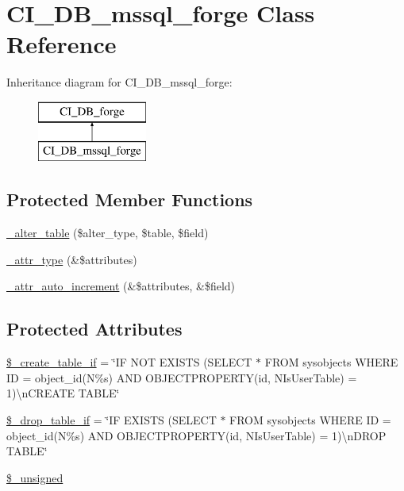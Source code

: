 \hypertarget{class_c_i___d_b__mssql__forge}{}\section{C\+I\+\_\+\+D\+B\+\_\+mssql\+\_\+forge Class Reference}
\label{class_c_i___d_b__mssql__forge}
Inheritance diagram for C\+I\+\_\+\+D\+B\+\_\+mssql\+\_\+forge\+:\begin{figure}[H]
\begin{center}
\leavevmode
\includegraphics[height=2.000000cm]{class_c_i___d_b__mssql__forge}
\end{center}
\end{figure}
\subsection*{Protected Member Functions}
\begin{DoxyCompactItemize}
\item 
\mbox{\hyperlink{class_c_i___d_b__mssql__forge_a41c6cae02f2fda8b429ad0afb9509426}{\+\_\+alter\+\_\+table}} (\$alter\+\_\+type, \$table, \$field)
\item 
\mbox{\hyperlink{class_c_i___d_b__mssql__forge_a8553be952084c6f7cdfff370a1d14f6b}{\+\_\+attr\+\_\+type}} (\&\$attributes)
\item 
\mbox{\hyperlink{class_c_i___d_b__mssql__forge_a2a013a5932439c3c44f0dad3436525f7}{\+\_\+attr\+\_\+auto\+\_\+increment}} (\&\$attributes, \&\$field)
\end{DoxyCompactItemize}
\subsection*{Protected Attributes}
\begin{DoxyCompactItemize}
\item 
\mbox{\hyperlink{class_c_i___d_b__mssql__forge_a2f6484fcb8d1dc3eef67a637227cd583}{\$\+\_\+create\+\_\+table\+\_\+if}} = \char`\"{}IF N\+OT E\+X\+I\+S\+TS (S\+E\+L\+E\+CT $\ast$ F\+R\+OM sysobjects W\+H\+E\+RE ID = object\+\_\+id(N\textquotesingle{}\%s\textquotesingle{}) A\+ND O\+B\+J\+E\+C\+T\+P\+R\+O\+P\+E\+R\+TY(id, N\textquotesingle{}Is\+User\+Table\textquotesingle{}) = 1)\textbackslash{}n\+C\+R\+E\+A\+TE T\+A\+B\+LE\char`\"{}
\item 
\mbox{\hyperlink{class_c_i___d_b__mssql__forge_a92a8a9145a7fc91e252e58d019373581}{\$\+\_\+drop\+\_\+table\+\_\+if}} = \char`\"{}IF E\+X\+I\+S\+TS (S\+E\+L\+E\+CT $\ast$ F\+R\+OM sysobjects W\+H\+E\+RE ID = object\+\_\+id(N\textquotesingle{}\%s\textquotesingle{}) A\+ND O\+B\+J\+E\+C\+T\+P\+R\+O\+P\+E\+R\+TY(id, N\textquotesingle{}Is\+User\+Table\textquotesingle{}) = 1)\textbackslash{}n\+D\+R\+OP T\+A\+B\+LE\char`\"{}
\item 
\mbox{\hyperlink{class_c_i___d_b__mssql__forge_aae977ae6d61fa183f0b25422b6ddc31c}{\$\+\_\+unsigned}}
\end{DoxyCompactItemize}
